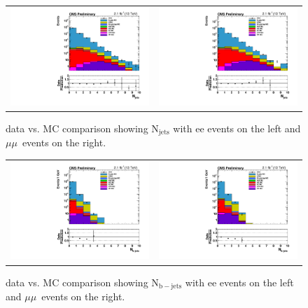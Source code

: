 \begin{figure}[!ht]
  \begin{center}
    \begin{tabular}{cc}
      \includegraphics[width=0.4\linewidth]{evtsel/figs/h_njets_ee_signalregion_inclusive_passtrig.pdf} &
      \includegraphics[width=0.4\linewidth]{evtsel/figs/h_njets_mm_signalregion_inclusive_passtrig.pdf} \\
    \end{tabular}
    \caption{
      \label{fig:datavsmc_njets}
      data vs. MC comparison showing $\mathrm{N_{jets}}$ with ee events on the left and $\mu\mu$~events on the right.
    }
  \end{center}
\end{figure}

\begin{figure}[!ht]
  \begin{center}
    \begin{tabular}{cc}
      \includegraphics[width=0.4\linewidth]{evtsel/figs/h_nbjets_ee_signalregion_inclusive_passtrig.pdf} &
      \includegraphics[width=0.4\linewidth]{evtsel/figs/h_nbjets_mm_signalregion_inclusive_passtrig.pdf} \\
    \end{tabular}
    \caption{
      \label{fig:datavsmc_nbjets}
      data vs. MC comparison showing $\mathrm{N_{b-jets}}$ with ee events on the left and $\mu\mu$~events on the right.
    }
  \end{center}
\end{figure}

